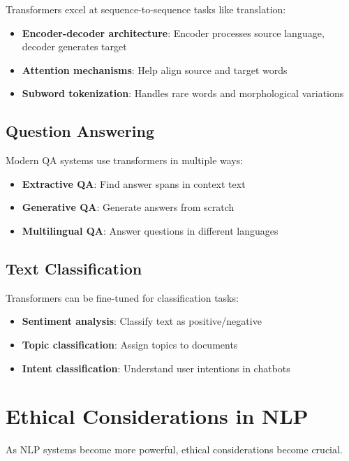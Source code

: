 \documentclass[11pt,a4paper]{article}
\theoremstyle{definition}
\theoremstyle{plain}
\theoremstyle{remark}
\begin{document}
Transformers excel at sequence-to-sequence tasks like translation:

\begin{itemize}
    \item \textbf{Encoder-decoder architecture}: Encoder processes source language, decoder generates target
    \item \textbf{Attention mechanisms}: Help align source and target words
    \item \textbf{Subword tokenization}: Handles rare words and morphological variations
\end{itemize}

\subsection{Question Answering}

Modern QA systems use transformers in multiple ways:

\begin{itemize}
    \item \textbf{Extractive QA}: Find answer spans in context text
    \item \textbf{Generative QA}: Generate answers from scratch
    \item \textbf{Multilingual QA}: Answer questions in different languages
\end{itemize}

\subsection{Text Classification}

Transformers can be fine-tuned for classification tasks:

\begin{itemize}
    \item \textbf{Sentiment analysis}: Classify text as positive/negative
    \item \textbf{Topic classification}: Assign topics to documents
    \item \textbf{Intent classification}: Understand user intentions in chatbots
\end{itemize}

\section{Ethical Considerations in NLP}

As NLP systems become more powerful, ethical considerations become crucial.
\end{document}
